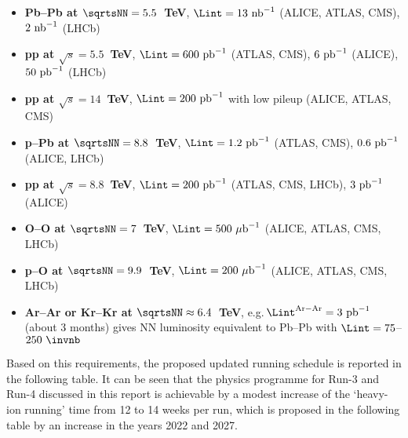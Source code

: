 \documentclass[../report.tex]{subfiles}
\begin{document}
\begin{itemize}

\item {\bf Pb--Pb at $\sqrtsNN=5.5$~TeV}, $\Lint=13~{\rm nb}^{-1}$ (ALICE, ATLAS, CMS), $2~{\rm nb}^{-1}$ (LHCb)

\item {\bf pp at $\sqrt s=5.5$~TeV}, $\Lint=600~{\rm pb}^{-1}$ (ATLAS, CMS), $6~{\rm pb}^{-1}$ (ALICE),  $50~{\rm pb}^{-1}$ (LHCb) 

\item {\bf pp at $\sqrt s=14$~TeV}, $\Lint=200~{\rm pb}^{-1}$ with low pileup (ALICE, ATLAS, CMS)

\item {\bf p--Pb at $\sqrtsNN=8.8$~TeV}, $\Lint=1.2~{\rm pb}^{-1}$ (ATLAS, CMS), $0.6~{\rm pb}^{-1}$ (ALICE, LHCb) 

\item {\bf pp at $\sqrt s=8.8$~TeV}, $\Lint=200~{\rm pb}^{-1}$ (ATLAS, CMS, LHCb), $3~{\rm pb}^{-1}$ (ALICE)

\item {\bf O--O at $\sqrtsNN=7$~TeV}, $\Lint=500~{\rm \mu b}^{-1}$ (ALICE, ATLAS, CMS, LHCb)

\item {\bf p--O at $\sqrtsNN=9.9$~TeV}, $\Lint=200~{\rm \mu b}^{-1}$ (ALICE, ATLAS, CMS, LHCb)

\item {\bf Ar--Ar or Kr--Kr at $\sqrtsNN\approx 6.4$~TeV}, e.g.\,$\Lint^{\rm Ar-Ar}=3~{\rm pb}^{-1}$ (about 3 months) gives NN luminosity equivalent to Pb--Pb with $\Lint =75$--$250~\invnb$

\end{itemize}

Based on this requirements, the proposed updated running schedule is reported in the following table. It can be seen that the physics programme for Run-3 and Run-4 discussed in this report is achievable by a modest increase of the `heavy-ion running' time from 12 to 14 weeks per run, which is proposed in the following table by an increase in the years 2022 and 2027. 
\end{document}
